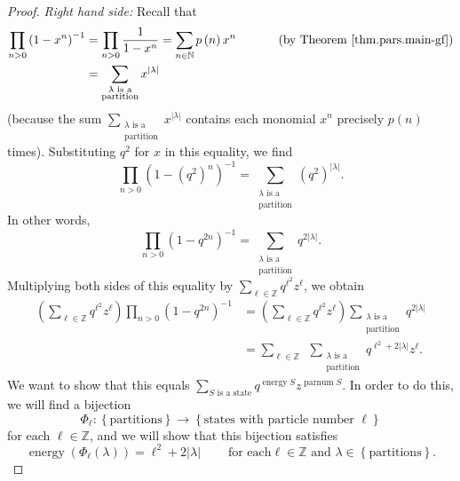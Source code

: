 \begin{proof}
\textit{Right hand side:} Recall that%
\begin{align*}
\prod_{n>0}\left(  1-x^{n}\right)  ^{-1}  &  =\prod_{n>0}\dfrac{1}{1-x^{n}%
}=\sum_{n\in\mathbb{N}}p\left(  n\right)  x^{n}\ \ \ \ \ \ \ \ \ \ \left(
\text{by Theorem \ref{thm.pars.main-gf}}\right) \\
&  =\sum_{\substack{\lambda\text{ is a}\\\text{partition}}}x^{\left\vert
\lambda\right\vert }%
\end{align*}
(because the sum $\sum_{\substack{\lambda\text{ is a}\\\text{partition}%
}}x^{\left\vert \lambda\right\vert }$ contains each monomial $x^{n}$ precisely
$p\left(  n\right)  $ times). Substituting $q^{2}$ for $x$ in this equality,
we find%
\[
\prod_{n>0}\left(  1-\left(  q^{2}\right)  ^{n}\right)  ^{-1}=\sum
_{\substack{\lambda\text{ is a}\\\text{partition}}}\left(  q^{2}\right)
^{\left\vert \lambda\right\vert }.
\]
In other words,%
\[
\prod_{n>0}\left(  1-q^{2n}\right)  ^{-1}=\sum_{\substack{\lambda\text{ is
a}\\\text{partition}}}q^{2\left\vert \lambda\right\vert }.
\]
Multiplying both sides of this equality by $\sum_{\ell\in\mathbb{Z}}%
q^{\ell^{2}}z^{\ell}$, we obtain%
\begin{align}
\left(  \sum_{\ell\in\mathbb{Z}}q^{\ell^{2}}z^{\ell}\right)  \prod
_{n>0}\left(  1-q^{2n}\right)  ^{-1}  &  =\left(  \sum_{\ell\in\mathbb{Z}%
}q^{\ell^{2}}z^{\ell}\right)  \sum_{\substack{\lambda\text{ is a}%
\\\text{partition}}}q^{2\left\vert \lambda\right\vert }\nonumber\\
&  =\sum_{\ell\in\mathbb{Z}}\ \ \sum_{\substack{\lambda\text{ is
a}\\\text{partition}}}q^{\ell^{2}+2\left\vert \lambda\right\vert }z^{\ell}.
\label{pf.thm.pars.jtp2.rhs1}%
\end{align}
We want to show that this equals $\sum\limits_{S\text{ is a state}%
}q^{\operatorname*{energy}S}z^{\operatorname*{parnum}S}$. In order to do this,
we will find a bijection%
\[
\Phi_{\ell}:\left\{  \text{partitions}\right\}  \rightarrow\left\{
\text{states with particle number }\ell\right\}
\]
for each $\ell\in\mathbb{Z}$, and we will show that this bijection satisfies
\[
\operatorname*{energy}\left(  \Phi_{\ell}\left(  \lambda\right)  \right)
=\ell^{2}+2\left\vert \lambda\right\vert \ \ \ \ \ \ \ \ \ \ \text{for each
}\ell\in\mathbb{Z}\text{ and }\lambda\in\left\{  \text{partitions}\right\}  .
\]



\end{proof}
